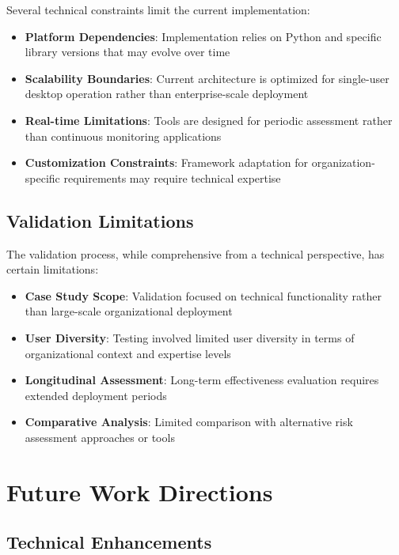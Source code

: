 \documentclass[binding=0.6cm]{sapthesis}
\begin{document}
Several technical constraints limit the current implementation:

\begin{itemize}
    \item \textbf{Platform Dependencies}: Implementation relies on Python and specific library versions that may evolve over time
    \item \textbf{Scalability Boundaries}: Current architecture is optimized for single-user desktop operation rather than enterprise-scale deployment
    \item \textbf{Real-time Limitations}: Tools are designed for periodic assessment rather than continuous monitoring applications
    \item \textbf{Customization Constraints}: Framework adaptation for organization-specific requirements may require technical expertise
\end{itemize}

\subsection{Validation Limitations}

The validation process, while comprehensive from a technical perspective, has certain limitations:

\begin{itemize}
    \item \textbf{Case Study Scope}: Validation focused on technical functionality rather than large-scale organizational deployment
    \item \textbf{User Diversity}: Testing involved limited user diversity in terms of organizational context and expertise levels
    \item \textbf{Longitudinal Assessment}: Long-term effectiveness evaluation requires extended deployment periods
    \item \textbf{Comparative Analysis}: Limited comparison with alternative risk assessment approaches or tools
\end{itemize}

\section{Future Work Directions}

\subsection{Technical Enhancements}
\end{document}
